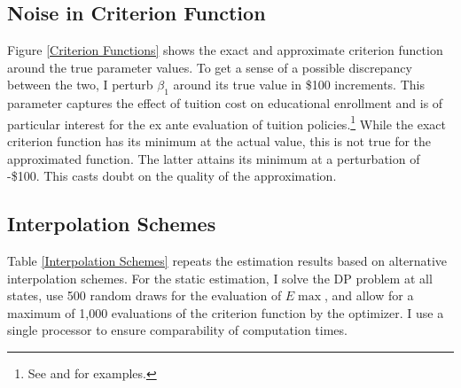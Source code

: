 \subsection{Noise in Criterion Function}\label{Noise in Criterion Function}
Figure \ref{Criterion Functions} shows the exact and approximate criterion function around the true parameter values. To get a sense of a possible discrepancy between the two, I perturb $\beta_1$ around its true value in \$100 increments. This parameter captures the effect of tuition cost on educational enrollment and is of particular interest for the ex ante evaluation of tuition policies.\footnote{See \citet{Keane.1997} and \citet{Keane.2001} for examples.} While the exact criterion function has its minimum at the actual value, this is not true for the approximated function. The latter attains its minimum at a perturbation of -\$100. This casts doubt on the quality of the approximation. 
\subsection{Interpolation Schemes}
Table \ref{Interpolation Schemes} repeats the estimation results based on alternative interpolation schemes. For the static estimation, I solve the DP problem at all states, use 500 random draws for the evaluation of $E\max$, and allow for a maximum of 1,000 evaluations of the criterion function by the optimizer. I use a single processor to ensure comparability of computation times.
